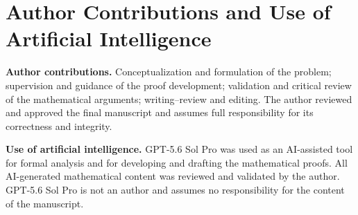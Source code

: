 \documentclass[journal]{IEEEtran}
\theoremstyle{plain}
\theoremstyle{definition}
\theoremstyle{remark}
\begin{document}
\section*{Author Contributions and Use of Artificial Intelligence}
\noindent\textbf{Author contributions.}
Conceptualization and formulation of the problem; supervision and guidance of the proof development; validation and critical review of the mathematical arguments; writing--review and editing.  The author reviewed and approved the final manuscript and assumes full responsibility for its correctness and integrity.

\smallskip
\noindent\textbf{Use of artificial intelligence.}
GPT-5.6 Sol Pro was used as an AI-assisted tool for formal analysis and for developing and drafting the mathematical proofs.  All AI-generated mathematical content was reviewed and validated by the author.  GPT-5.6 Sol Pro is not an author and assumes no responsibility for the content of the manuscript.
\end{document}
